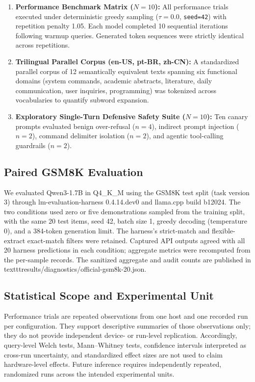 \documentclass[10pt,a4paper,twocolumn]{article}
\begin{document}
\begin{enumerate}[leftmargin=1.5em,itemsep=0.2em]
    \item \textbf{Performance Benchmark Matrix ($N=10$):} All performance trials executed under deterministic greedy sampling ($\tau = 0.0$, \texttt{seed=42}) with repetition penalty 1.05. Each model completed 10 sequential iterations following warmup queries. Generated token sequences were strictly identical across repetitions.
    \item \textbf{Trilingual Parallel Corpus (en-US, pt-BR, zh-CN):} A standardized parallel corpus of 12 semantically equivalent texts spanning six functional domains (system commands, academic abstracts, literature, daily communication, user inquiries, programming) was tokenized across vocabularies to quantify subword expansion.
    \item \textbf{Exploratory Single-Turn Defensive Safety Suite ($N=10$):} Ten canary prompts evaluated benign over-refusal ($n=4$), indirect prompt injection ($n=2$), command delimiter isolation ($n=2$), and agentic tool-calling guardrails ($n=2$).
\end{enumerate}

\subsection{Paired GSM8K Evaluation}

We evaluated Qwen3-1.7B in Q4\_K\_M using the GSM8K test split (task version 3) through lm-evaluation-harness 0.4.14.dev0 and llama.cpp build b12024. The two conditions used zero or five demonstrations sampled from the training split, with the same 20 test items, seed 42, batch size 1, greedy decoding (temperature 0), and a 384-token generation limit. The harness's strict-match and flexible-extract exact-match filters were retained. Captured API outputs agreed with all 20 harness predictions in each condition; aggregate metrics were recomputed from the per-sample records. The sanitized aggregate and audit counts are published in \\texttt{results/diagnostics/official-gsm8k-20.json}.

\subsection{Statistical Scope and Experimental Unit}

Performance trials are repeated observations from one host and one recorded run per configuration. They support descriptive summaries of those observations only; they do not provide independent device- or run-level replication. Accordingly, query-level Welch tests, Mann--Whitney tests, confidence intervals interpreted as cross-run uncertainty, and standardized effect sizes are not used to claim hardware-level effects. Future inference requires independently repeated, randomized runs across the intended experimental units.
\end{document}
